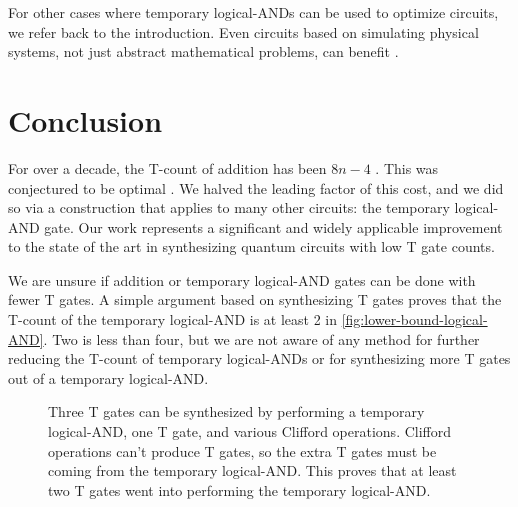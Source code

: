 \documentclass[twocolumn]{revtex4-1}
\newcommand{\qT}{\gate{T}}
\newcommand{\qS}{\gate{S}}
\begin{document}
For other cases where temporary logical-ANDs can be used to optimize circuits, we refer back to the introduction.
Even circuits based on simulating physical systems, not just abstract mathematical problems, can benefit \citep{RyanEmails2017}.


\section{Conclusion}
\label{sec:conclusion}

For over a decade, the T-count of addition has been $8n - 4$ \citep{Amy2013, Barenco1995, Cuccaro2004}.
This was conjectured to be optimal \citep{AustinDiscussionsAndEmails2017}.
We halved the leading factor of this cost, and we did so via a construction that applies to many other circuits: the temporary logical-AND gate.
Our work represents a significant and widely applicable improvement to the state of the art in synthesizing quantum circuits with low T gate counts.

We are unsure if addition or temporary logical-AND gates can be done with fewer T gates.
A simple argument based on synthesizing T gates proves that the T-count of the temporary logical-AND is at least 2 in \autoref{fig:lower-bound-logical-AND}.
Two is less than four, but we are not aware of any method for further reducing the T-count of temporary logical-ANDs or for synthesizing more T gates out of a temporary logical-AND.

\begin{figure}
  \resizebox{\linewidth}{!}{
    \Qcircuit @R=0.7em @C=0.7em {
      &\qT &\qw && &&&\ctrl{2}&\qw     &\ctrl{3}&\qw     &\qw &\qw     &\ctrl{3}&\qw     &\ctrl{2}&\qw &\\
      &\qT &\qw &&=&&&\targ   &\ctrl{1}&\qw     &\ctrl{1}&\qw &\ctrl{1}&\qw     &\ctrl{1}&\targ   &\qw &\\
      &\qT &\qw && &&&\targ   &\ctrl{1}&\targ   &\targ   &\qT &\targ   &\targ   &\ctrl{1}&\targ   &\qw &\\
      &    &    && &&&        &        &\targ   &\qw     &\qS &\qw     &\targ   &\qw     &        &    &\\
    }
  }
  \caption{
	Three T gates can be synthesized by performing a temporary logical-AND, one T gate, and various Clifford operations.
	Clifford operations can't produce T gates, so the extra T gates must be coming from the temporary logical-AND.
	This proves that at least two T gates went into performing the temporary logical-AND.
  }
  \label{fig:lower-bound-logical-AND}
\end{figure}
\end{document}
